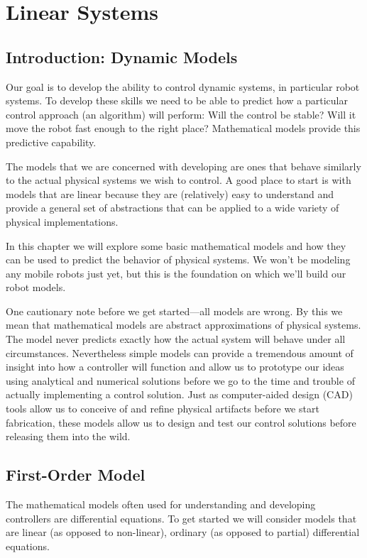 \chapter{Linear Systems}\label{c:linsys}
\section{Introduction: Dynamic Models}
Our goal is to develop the ability to control dynamic systems, in particular robot systems.  To develop these skills we need to be able to predict how a particular control approach (an algorithm) will perform: Will the control be stable?  Will it move the robot fast enough to the right place?  Mathematical models provide this predictive capability.  

The models that we are concerned with developing are ones that behave similarly to the actual physical systems we wish to control.  A good place to start is with models that are linear because they are (relatively) easy to understand and provide a general set of abstractions that can be applied to a wide variety of physical implementations.

In this chapter we will explore some basic mathematical models and how they can be used to predict the behavior of physical systems.  We won't be modeling any mobile robots just yet, but this is the foundation on which we'll build our robot models.

One cautionary note before we get started---all models are wrong.  By this we mean that mathematical models are abstract approximations of physical systems.  The model never predicts exactly how the actual system will behave under all circumstances.  Nevertheless simple models can provide a tremendous amount of insight into how a controller will function and allow us to prototype our ideas using analytical and numerical solutions before we go to the time and trouble of actually implementing a control solution.  Just as computer-aided design (CAD) tools allow us to conceive of and refine physical artifacts before we start fabrication, these models allow us to design and test our control solutions before releasing them into the wild.

\section{First-Order Model}
The mathematical models often used for understanding and developing controllers are differential equations.  To get started we will consider models that are linear (as opposed to non-linear), ordinary (as opposed to partial) differential equations.  

